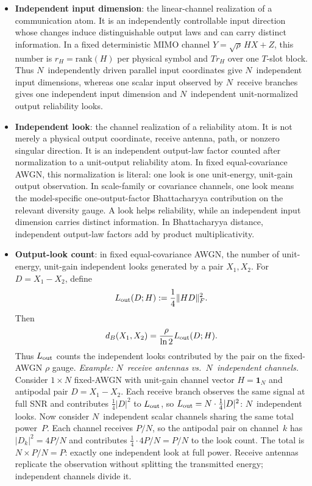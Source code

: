 \documentclass[lettersize,onecolumn]{IEEEtran}
\newcommand{\snr}{\rho}
\begin{document}
\begin{itemize}
\item \textbf{Independent input dimension}: the linear-channel
realization of a communication atom. It is an
independently controllable input direction whose changes induce
distinguishable output laws and can carry distinct information. In a
fixed deterministic MIMO channel
$Y = \sqrt{\snr}\,HX + Z$, this number is
$r_H = \mathrm{rank}(H)$ per physical symbol and $Tr_H$ over one
$T$-slot block. Thus $N$~independently driven parallel input
coordinates give $N$~independent input dimensions, whereas one
scalar input observed by $N$~receive branches gives one independent
input dimension and $N$~independent unit-normalized output
reliability looks.

\item \textbf{Independent look}: the channel realization of a
reliability atom. It is not merely a physical output coordinate,
receive antenna, path, or nonzero singular direction. It is an
independent output-law factor counted after normalization to a
unit-output reliability atom. In fixed equal-covariance AWGN, this
normalization is literal: one look is one unit-energy, unit-gain
output observation. In scale-family or covariance channels, one look
means the model-specific one-output-factor Bhattacharyya contribution
on the relevant diversity gauge. A look helps reliability, while an
independent input dimension carries distinct information. In
Bhattacharyya distance, independent output-law factors add by product
multiplicativity.

\item \textbf{Output-look count}: in fixed equal-covariance AWGN, the
number of unit-energy, unit-gain independent looks generated by
a pair $X_1,X_2$. For $D=X_1-X_2$, define
\[
L_{\rm out}(D;H):=\frac14\|HD\|_F^2.
\]
Then
\[
d_B(X_1,X_2)=\frac{\snr}{\ln 2}L_{\rm out}(D;H).
\]
Thus $L_{\rm out}$ counts the independent looks contributed by
the pair on the fixed-AWGN $\snr$ gauge.
\emph{Example: $N$~receive antennas vs.\ $N$~independent channels.}
Consider $1 \times N$ fixed-AWGN with unit-gain channel vector
$H = \mathbf{1}_N$ and antipodal pair $D = X_1 - X_2$.
Each receive branch observes the same signal at full SNR and
contributes $\frac{1}{4}|D|^2$ to $L_{\rm out}$, so
$L_{\rm out} = N \cdot \frac{1}{4}|D|^2$: $N$~independent looks.
Now consider $N$~independent scalar channels sharing the same total
power~$P$.  Each channel receives $P/N$, so the antipodal pair on
channel~$k$ has $|D_k|^2 = 4P/N$ and contributes
$\frac{1}{4}\cdot 4P/N = P/N$ to the look count.  The total is
$N \times P/N = P$: exactly one independent look at full power.
Receive antennas replicate the observation without splitting the
transmitted energy; independent channels divide it.


\end{itemize}
\end{document}
